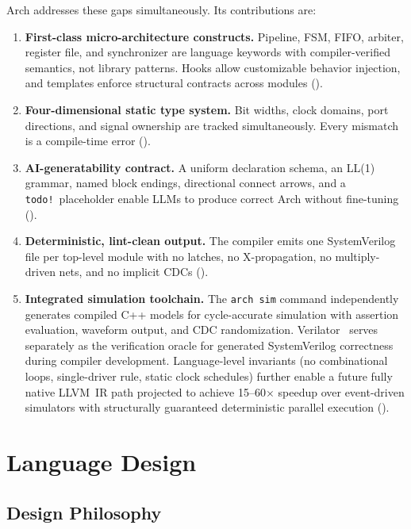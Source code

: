 \documentclass[11pt,twocolumn]{article}
\begin{document}
Arch addresses these gaps simultaneously. Its contributions are:

\begin{enumerate}
\item \textbf{First-class micro-architecture constructs.} Pipeline, FSM, FIFO, arbiter, register file, and synchronizer are language keywords with compiler-verified semantics, not library patterns. Hooks allow customizable behavior injection, and templates enforce structural contracts across modules ().

\item \textbf{Four-dimensional static type system.} Bit widths, clock domains, port directions, and signal ownership are tracked simultaneously. Every mismatch is a compile-time error ().

\item \textbf{AI-generatability contract.} A uniform declaration schema, an LL(1) grammar, named block endings, directional connect arrows, and a \texttt{todo!}\ placeholder enable LLMs to produce correct Arch without fine-tuning ().

\item \textbf{Deterministic, lint-clean output.} The compiler emits one SystemVerilog file per top-level module with no latches, no X-propagation, no multiply-driven nets, and no implicit CDCs ().

\item \textbf{Integrated simulation toolchain.} The \texttt{arch sim} command independently generates compiled C++ models for cycle-accurate simulation with assertion evaluation, waveform output, and CDC randomization. Verilator~\cite{verilator} serves separately as the verification oracle for generated SystemVerilog correctness during compiler development. Language-level invariants (no combinational loops, single-driver rule, static clock schedules) further enable a future fully native LLVM~IR path projected to achieve 15--60$\times$ speedup over event-driven simulators with structurally guaranteed deterministic parallel execution ().
\end{enumerate}

\section{Language Design}\label{sec:design}

\subsection{Design Philosophy}
\end{document}

